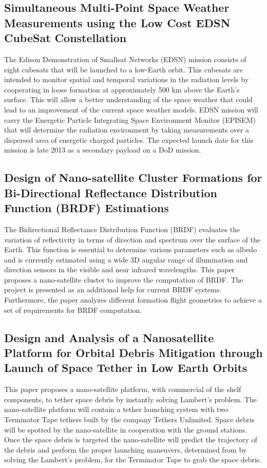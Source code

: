 \subsection{Simultaneous Multi-Point Space Weather Measurements using the Low Cost EDSN CubeSat Constellation}

The Edison Demonstration of Smallsat Networks (EDSN) mission consists of eight cubesats that will be launched to a low-Earth orbit. This cubesats are intended to monitor spatial and temporal variations in the radiation levels by cooperating in loose formation at approximately 500 km above the Earth's surface. This will allow a better understanding of the space weather that could lead to an improvement of the current space weather models. EDSN mission will carry the Energetic Particle Integrating Space Environment Monitor (EPISEM) that will determine 
the radiation environment by taking measurements over a dispersed area of energetic charged particles. The expected launch date for this mission is late 2013 as a secondary payload on a DoD mission.\cite{Gunderson_MultiptMeasureConstellation}\cite{Yost_MultipointMeasurement}

\subsection{Design of Nano-satellite Cluster Formations for Bi-Directional Reflectance Distribution Function (BRDF) Estimations}

The Bidirectional Reflectance Distribution Function (BRDF) evaluates the variation of reflectivity in terms of direction and spectrum over the surface of the Earth. This function is essential to determine various parameters such as albedo and is currently estimated using a wide 3D angular range of illumination and direction sensors in the 
visible and near infrared wavelengths. This paper proposes a nano-satellite cluster to improve the computation of BRDF. The project is presented as an additional help for current BRDF systems. Furthermore, the paper analyzes different formation flight geometries to achieve a set of requirements for BRDF computation. \cite{Nag_BRDF}

\subsection{Design and Analysis of a Nanosatellite Platform for Orbital Debris Mitigation through Launch of Space Tether in Low Earth Orbits}

This paper proposes a nano-satellite platform, with commercial of the shelf components, to tether space debris by instantly solving Lambert's problem. The nano-satellite platform will contain a tether launching system with two Terminator Tape tethers built by the company Tethers Unlimited. Space debris will be spotted by the nano-satellite 
in cooperation with the ground stations. Once the space debris is targeted the nano-satellite will predict the trajectory of the debris and perform the proper launching maneuvers, determined from by solving the Lambert's problem, for the Terminator Tape to grab the space debris.\cite{Asundi_SpaceDebris} 

